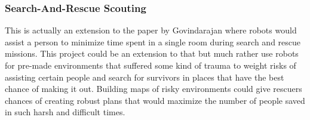       \subsubsection{Search-And-Rescue Scouting}
        This is actually an extension to the paper by Govindarajan\cite{Vijay} where robots would assist a person to minimize time spent in a single room during search and rescue missions. This project could be an extension to that but much rather use robots for pre-made environments that suffered some kind of trauma to weight risks of assisting certain people and search for survivors in places that have the best chance of making it out. Building maps of risky environments could give rescuers chances of creating robust plans that would maximize the number of people saved in such harsh and difficult times.